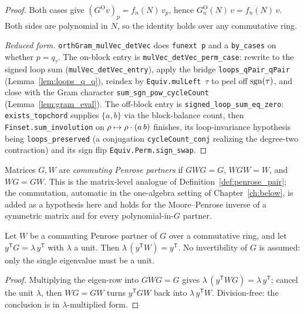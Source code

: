 \begin{proof}
\medskip
Both cases give $(G^{\mathrm O}v)_p=f_n(N)\,v_p$, hence
$G^{\mathrm O}_n(N)\,v=f_n(N)\,v$. Both sides are polynomial in $N$, so the
identity holds over any commutative ring.

\medskip\noindent\emph{Reduced form.} \texttt{orthGram\_mulVec\_detVec} does
\texttt{funext p} and a \texttt{by\_cases} on whether $p=q_\tau$. The on-block
entry is \texttt{mulVec\_detVec\_perm\_case}: rewrite to the signed loop sum
(\texttt{mulVec\_detVec\_entry}), apply the bridge
\texttt{loops\_qPair\_qPair} (Lemma~\ref{lem:loops_q_q}), reindex by
\texttt{Equiv.mulLeft}~$\tau$ to peel off $\operatorname{sgn}(\tau)$, and close with the Gram
character \texttt{sum\_sgn\_pow\_cycleCount} (Lemma~\ref{lem:gram_eval}). The
off-block entry is \texttt{signed\_loop\_sum\_eq\_zero}: \texttt{exists\_topchord}
supplies $\{a,b\}$ via the block-balance count, then
\texttt{Finset.sum\_involution} on $\rho\mapsto\rho\cdot(a\,b)$ finishes, its
loop-invariance hypothesis being \texttt{loops\_preserved} (a conjugation
\texttt{cycleCount\_conj} realizing the degree-two contraction) and its sign
flip \texttt{Equiv.Perm.sign\_swap}.
\end{proof}

\begin{definition}\label{def:comm_penrose}
\leanok
Matrices $G, W$ are \emph{commuting Penrose partners} if $GWG=G$, $WGW=W$,
and $WG=GW$. This is the matrix-level analogue of
Definition~\ref{def:penrose_pair}; the commutation, automatic in the
one-algebra setting of Chapter~\ref{ch:below}, is added as a hypothesis
here and holds for the Moore--Penrose inverse of a symmetric matrix and for
every polynomial-in-$G$ partner.
\end{definition}

\begin{lemma}\label{lem:penrose_eigen}
\leanok
{}
Let $W$ be a commuting Penrose partner of $G$ over a commutative ring,
and let $y^{\mathsf T}G = \lambda\,y^{\mathsf T}$ with $\lambda$ a unit.
Then $\lambda\,(y^{\mathsf T}W) = y^{\mathsf T}$. No invertibility of $G$
is assumed: only the single eigenvalue must be a unit.
\end{lemma}
\begin{proof}
\leanok
{}
Multiplying the eigen-row into $GWG=G$ gives
$\lambda\,(y^{\mathsf T}WG) = \lambda\,y^{\mathsf T}$; cancel the unit
$\lambda$, then $WG=GW$ turns $y^{\mathsf T}GW$ back into
$\lambda\,y^{\mathsf T}W$. Division-free: the conclusion is in
$\lambda$-multiplied form.
\end{proof}

